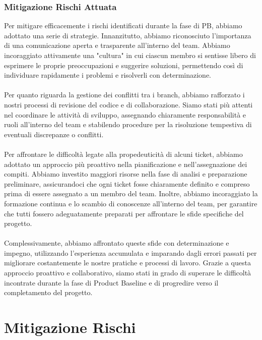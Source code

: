 \documentclass[5pt]{article}
\begin{document}
    \subsubsection{Mitigazione Rischi Attuata}
    Per mitigare efficacemente i rischi identificati durante la fase di PB, abbiamo adottato una serie di strategie. Innanzitutto, abbiamo riconosciuto l'importanza di una comunicazione aperta e trasparente all'interno del team. Abbiamo incoraggiato attivamente una "cultura" in cui ciascun membro si sentisse libero di esprimere le proprie preoccupazioni e suggerire soluzioni, permettendo così di individuare rapidamente i problemi e risolverli con determinazione.\\\\
    Per quanto riguarda la gestione dei conflitti tra i branch, abbiamo rafforzato i nostri processi di revisione del codice e di collaborazione. Siamo stati più attenti nel coordinare le attività di sviluppo, assegnando chiaramente responsabilità e ruoli all'interno del team e stabilendo procedure per la risoluzione tempestiva di eventuali discrepanze o conflitti.\\\\
    Per affrontare le difficoltà legate alla propedeuticità di alcuni ticket, abbiamo adottato un approccio più proattivo nella pianificazione e nell'assegnazione dei compiti. Abbiamo investito maggiori risorse nella fase di analisi e preparazione preliminare, assicurandoci che ogni ticket fosse chiaramente definito e compreso prima di essere assegnato a un membro del team. Inoltre, abbiamo incoraggiato la formazione continua e lo scambio di conoscenze all'interno del team, per garantire che tutti fossero adeguatamente preparati per affrontare le sfide specifiche del progetto.\\\\
    Complessivamente, abbiamo affrontato queste sfide con determinazione e impegno, utilizzando l'esperienza accumulata e imparando dagli errori passati per migliorare costantemente le nostre pratiche e processi di lavoro. Grazie a questa approccio proattivo e collaborativo, siamo stati in grado di superare le difficoltà incontrate durante la fase di Product Baseline e di progredire verso il completamento del progetto.
    

\section{Mitigazione Rischi}
\end{document}
